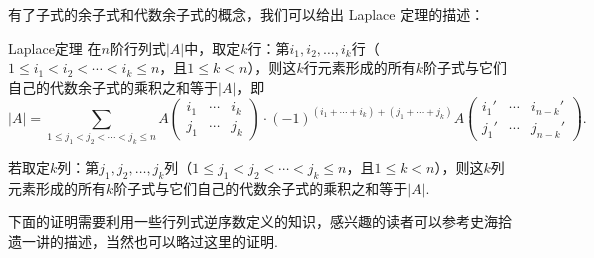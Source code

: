 有了子式的余子式和代数余子式的概念，我们可以给出 Laplace 定理的描述：

\begin{theorem}{}{Laplace定理}
    在$n$阶行列式$|A|$中，取定$k$行：第$i_1,i_2,\ldots,i_k$行（$1\leqslant i_1<i_2<\cdots<i_k\leqslant n$，且$1\leqslant k<n$），则这$k$行元素形成的所有$k$阶子式与它们自己的代数余子式的乘积之和等于$|A|$，即
    \begin{equation}\label{eq:14:Laplace定理}
        |A|=\sum_{1\leqslant j_1<j_2<\cdots<j_k\leqslant n}A\begin{pmatrix}
            i_1 & \cdots & i_k \\
            j_1 & \cdots & j_k
        \end{pmatrix}\cdot (-1)^{(i_1+\cdots+i_k)+(j_1+\cdots+j_k)}A\begin{pmatrix}
            i_1' & \cdots & i_{n-k}' \\
            j_1' & \cdots & j_{n-k}'
        \end{pmatrix}.
    \end{equation}

    若取定$k$列：第$j_1,j_2,\ldots,j_k$列（$1\leqslant j_1<j_2<\cdots<j_k\leqslant n$，且$1\leqslant k<n$），则这$k$列元素形成的所有$k$阶子式与它们自己的代数余子式的乘积之和等于$|A|$.
\end{theorem}

下面的证明需要利用一些行列式逆序数定义的知识，感兴趣的读者可以参考史海拾遗一讲的描述，当然也可以略过这里的证明.

